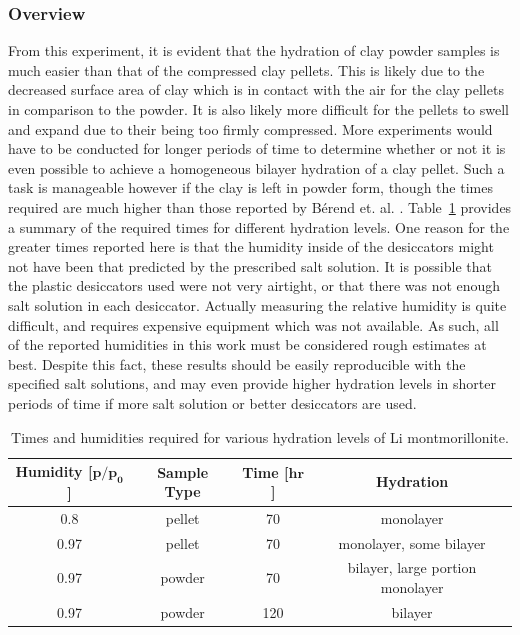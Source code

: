 \subsubsection{Overview}
From this experiment, it is evident that the hydration of clay powder samples is much easier than that of the compressed clay pellets. This is likely due to the decreased surface area of clay which is in contact with the air for the clay pellets in comparison to the powder. It is also likely more difficult for the pellets to swell and expand due to their being too firmly compressed. More experiments would have to be conducted for longer periods of time to determine whether or not it is even possible to achieve a homogeneous bilayer hydration of a clay pellet. Such a task is manageable however if the clay is left in powder form, though the times required are much higher than those reported by Bérend et. al. \cite{berend1995mechanism}. Table~\ref{tab:hyd_time} provides a summary of the required times for different hydration levels. One reason for the greater times reported here is that the humidity inside of the desiccators might not have been that predicted by the prescribed salt solution. It is possible that the plastic desiccators used were not very airtight, or that there was not enough salt solution in each desiccator. Actually measuring the relative humidity is quite difficult, and requires expensive equipment which was not available. As such, all of the reported humidities in this work must be considered rough estimates at best. Despite this fact, these results should be easily reproducible with the specified salt solutions, and may even provide higher hydration levels in shorter periods of time if more salt solution or better desiccators are used.
\begin{table}
	\centering
	\caption{Times and humidities required for various hydration levels of Li montmorillonite.}
	\label{tab:hyd_time}
	\begin{tabular}{|c|c|c|c|}
		\hline
		\textbf{Humidity [$\bm{p/p_0}$]} & \textbf{Sample Type} & \textbf{Time [$\bm{hr}$]} & \textbf{Hydration} \\
		\hline
		\hline
		0.8 & pellet & 70 & monolayer \\
		\hline
		0.97 & pellet & 70 & monolayer, some bilayer \\
		\hline
		0.97 & powder & 70 & bilayer, large portion monolayer \\
		\hline
		0.97 & powder & 120 & bilayer \\
		\hline		
	\end{tabular}
\end{table}


